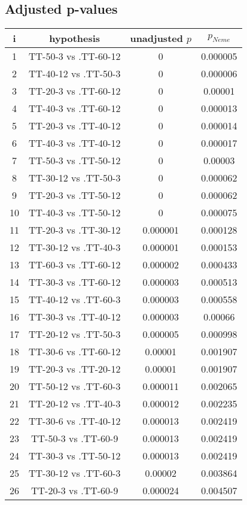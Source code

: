 \documentclass[a4paper,10pt]{article}
\begin{document}
\begin{landscape}
\pagebreak

\subsection{Adjusted p-values}

\begin{table}[!htp]
\centering\scriptsize
\begin{tabular}{cccc}
i&hypothesis&unadjusted $p$&$p_{Neme}$\\
\hline1&TT-50-3 vs .TT-60-12&0&0.000005\\
2&TT-40-12 vs .TT-50-3&0&0.000006\\
3&TT-20-3 vs .TT-60-12&0&0.00001\\
4&TT-40-3 vs .TT-60-12&0&0.000013\\
5&TT-20-3 vs .TT-40-12&0&0.000014\\
6&TT-40-3 vs .TT-40-12&0&0.000017\\
7&TT-50-3 vs .TT-50-12&0&0.00003\\
8&TT-30-12 vs .TT-50-3&0&0.000062\\
9&TT-20-3 vs .TT-50-12&0&0.000062\\
10&TT-40-3 vs .TT-50-12&0&0.000075\\
11&TT-20-3 vs .TT-30-12&0.000001&0.000128\\
12&TT-30-12 vs .TT-40-3&0.000001&0.000153\\
13&TT-60-3 vs .TT-60-12&0.000002&0.000433\\
14&TT-30-3 vs .TT-60-12&0.000003&0.000513\\
15&TT-40-12 vs .TT-60-3&0.000003&0.000558\\
16&TT-30-3 vs .TT-40-12&0.000003&0.00066\\
17&TT-20-12 vs .TT-50-3&0.000005&0.000998\\
18&TT-30-6 vs .TT-60-12&0.00001&0.001907\\
19&TT-20-3 vs .TT-20-12&0.00001&0.001907\\
20&TT-50-12 vs .TT-60-3&0.000011&0.002065\\
21&TT-20-12 vs .TT-40-3&0.000012&0.002235\\
22&TT-30-6 vs .TT-40-12&0.000013&0.002419\\
23&TT-50-3 vs .TT-60-9&0.000013&0.002419\\
24&TT-30-3 vs .TT-50-12&0.000013&0.002419\\
25&TT-30-12 vs .TT-60-3&0.00002&0.003864\\
26&TT-20-3 vs .TT-60-9&0.000024&0.004507\\

\end{tabular}
\end{table}
\end{landscape}
\end{document}
